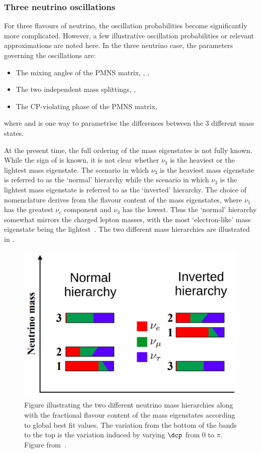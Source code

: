 \subsubsection{Three neutrino oscillations}
\label{sec:theory:theory:threeNeutrino}

For three flavours of neutrino, the oscillation probabilities become significantly more complicated.
However, a few illustrative oscillation probabilities or relevant approximations are noted here.
In the three neutrino case, the parameters governing the oscillations are:
\begin{itemize}
\item The mixing angles of the PMNS matrix, , , 
\item The two independent mass splittings, , 
\item The CP-violating phase of the PMNS matrix, \dcp
\end{itemize}
where  and  is one way to parametrise the differences between the 3 different mass states.

At the present time, the full ordering of the mass eigenstates is not fully known.
While the sign of  is known, it is not clear whether $\nu_{3}$ is the heaviest or the lightest mass eigenstate.
The scenario in which $\nu_{3}$ is the heaviest mass eigenstate is referred to as the `normal' hierarchy while the scenario in which $\nu_{3}$ is the lightest mass eigenstate is referred to as the `inverted' hierarchy.
The choice of nomenclature derives from the flavour content of the mass eigenstates, where $\nu_{1}$ has the greatest $\nu_{e}$ component and $\nu_{3}$ has the lowest.
Thus the `normal' hierarchy somewhat mirrors the charged lepton masses, with the most `electron-like' mass eigenstate being the lightest~\cite{massHierarchy}.
The two different mass hierarchies are illustrated in .

\begin{figure}[h]
  \centering
  \includegraphics[width=.7\linewidth]{files/figures/theory/mh}
  \caption[Diagram of neutrino mass hierarchies.]{Figure illustrating the two different neutrino mass hierarchies along with the fractional flavour content of the mass eigenstates according to global best fit values. The variation from the bottom of the bands to the top is the variation induced by varying $\dcp$ from 0 to $\pi$. Figure from~\cite{tdrVol2}.}
  \label{fig:massHierarchy}
\end{figure}

